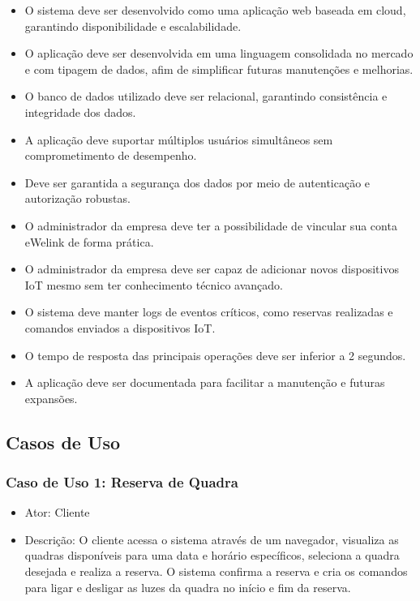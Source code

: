 \begin{itemize}
     \item O sistema deve ser desenvolvido como uma aplicação web baseada em cloud, garantindo disponibilidade e escalabilidade.
     \item O aplicação deve ser desenvolvida em uma linguagem consolidada no mercado e com tipagem de dados, afim de simplificar futuras manutenções e melhorias.
     \item O banco de dados utilizado deve ser relacional, garantindo consistência e integridade dos dados.
     \item A aplicação deve suportar múltiplos usuários simultâneos sem comprometimento de desempenho.
     \item Deve ser garantida a segurança dos dados por meio de autenticação e autorização robustas.
     \item O administrador da empresa deve ter a possibilidade de vincular sua conta eWelink de forma prática.
     \item O administrador da empresa deve ser capaz de adicionar novos dispositivos IoT mesmo sem ter conhecimento técnico avançado.
     \item O sistema deve manter logs de eventos críticos, como reservas realizadas e comandos enviados a dispositivos IoT.
     \item O tempo de resposta das principais operações deve ser inferior a 2 segundos.
     \item A aplicação deve ser documentada para facilitar a manutenção e futuras expansões.
\end{itemize}


\subsection{Casos de Uso}\label{subsec:casos_de_uso}

\subsubsection*{Caso de Uso 1: Reserva de Quadra}
\begin{itemize}
     \item Ator: Cliente
     \item Descrição: O cliente acessa o sistema através de um navegador, visualiza as quadras disponíveis para uma data e horário específicos, seleciona a quadra desejada e realiza a reserva. O sistema confirma a reserva e cria os comandos para ligar e desligar as luzes da quadra no início e fim da reserva.
\end{itemize}


